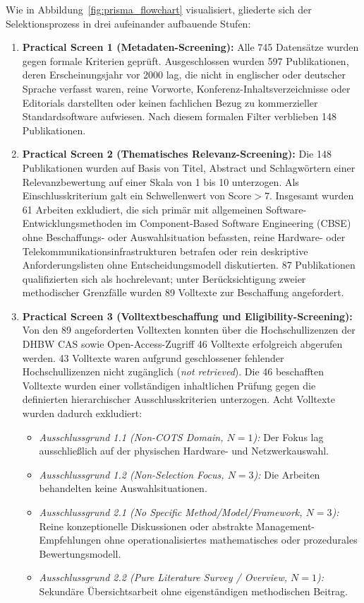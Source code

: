 Wie in Abbildung~\ref{fig:prisma_flowchart} visualisiert, gliederte sich der Selektionsprozess in drei aufeinander aufbauende Stufen:
\begin{enumerate}[label=\textbf{Stufe \arabic*:}, leftmargin=*]
  \item \textbf{Practical Screen 1 (Metadaten-Screening):} Alle 745 Datensätze wurden gegen formale Kriterien geprüft. Ausgeschlossen wurden 597 Publikationen, deren Erscheinungsjahr vor 2000 lag, die nicht in englischer oder deutscher Sprache verfasst waren, reine Vorworte, Konferenz-Inhaltsverzeichnisse oder Editorials darstellten oder keinen fachlichen Bezug zu kommerzieller Standardsoftware aufwiesen. Nach diesem formalen Filter verblieben 148 Publikationen.
  \item \textbf{Practical Screen 2 (Thematisches Relevanz-Screening):} Die 148 Publikationen wurden auf Basis von Titel, Abstract und Schlagwörtern einer Relevanzbewertung auf einer Skala von 1 bis 10 unterzogen. Als Einschlusskriterium galt ein Schwellenwert von $\text{Score} > 7$. Insgesamt wurden 61 Arbeiten exkludiert, die sich primär mit allgemeinen Software-Entwicklungsmethoden im Component-Based Software Engineering (CBSE) ohne Beschaffungs- oder Auswahlsituation befassten, reine Hardware- oder Telekommunikationsinfrastrukturen betrafen oder rein deskriptive Anforderungslisten ohne Entscheidungsmodell diskutierten. 87 Publikationen qualifizierten sich als hochrelevant; unter Berücksichtigung zweier methodischer Grenzfälle wurden 89 Volltexte zur Beschaffung angefordert.
  \item \textbf{Practical Screen 3 (Volltextbeschaffung und Eligibility-Screening):} Von den 89 angeforderten Volltexten konnten über die Hochschullizenzen der DHBW CAS sowie Open-Access-Zugriff 46 Volltexte erfolgreich abgerufen werden. 43 Volltexte waren aufgrund geschlossener fehlender Hochschullizenzen nicht zugänglich (\textit{not retrieved}). Die 46 beschafften Volltexte wurden einer vollständigen inhaltlichen Prüfung gegen die definierten hierarchischer Ausschlusskriterien unterzogen. Acht Volltexte wurden dadurch exkludiert:
  \begin{itemize}[leftmargin=*]
    \item \textit{Ausschlussgrund 1.1 (Non-COTS Domain, $N = 1$):} Der Fokus lag ausschließlich auf der physischen Hardware- und Netzwerkauswahl.
    \item \textit{Ausschlussgrund 1.2 (Non-Selection Focus, $N = 3$):} Die Arbeiten behandelten keine Auswahlsituationen.
    \item \textit{Ausschlussgrund 2.1 (No Specific Method/Model/Framework, $N = 3$):} Reine konzeptionelle Diskussionen oder abstrakte Management-Empfehlungen ohne operationalisiertes mathematisches oder prozedurales Bewertungsmodell.
    \item \textit{Ausschlussgrund 2.2 (Pure Literature Survey / Overview, $N = 1$):} Sekundäre Übersichtsarbeit ohne eigenständigen methodischen Beitrag.
  \end{itemize}
\end{enumerate}

